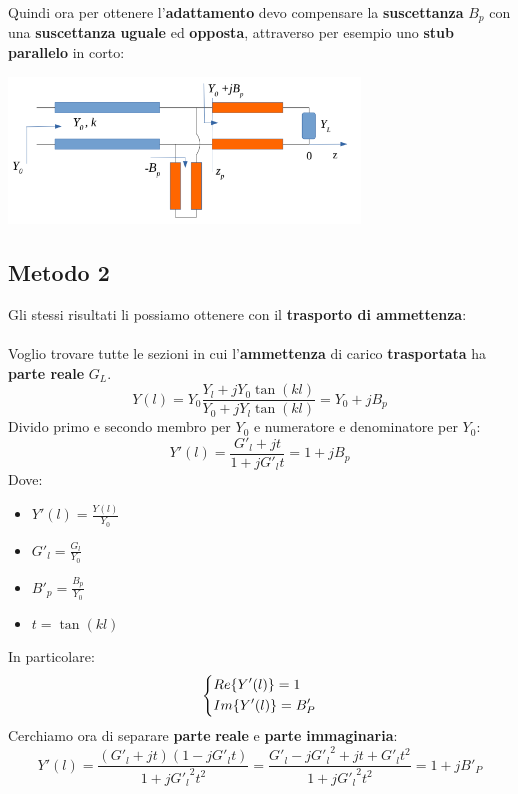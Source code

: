 Quindi ora per ottenere l'\textbf{adattamento} devo compensare la \textbf{suscettanza} $B_p$ con una \textbf{suscettanza} \textbf{uguale} ed \textbf{opposta}, attraverso per esempio uno \textbf{stub parallelo} in corto:
\begin{center}
    \includegraphics[width=0.7\textwidth]{Images/figure26.png}
\end{center}
\subsection{Metodo 2}
Gli stessi risultati li possiamo ottenere con il \textbf{trasporto di ammettenza}:\\ \\
Voglio trovare tutte le sezioni in cui l'\textbf{ammettenza} di carico \textbf{trasportata} ha \textbf{parte reale} $G_L$.
\begin{equation*}
    Y(l) = Y_0 \frac{Y_l + j Y_0 \tan(kl)}{Y_0 + j Y_l \tan(kl)} = Y_0 + j B_p
\end{equation*}
Divido primo e secondo membro per $Y_0$ e numeratore e denominatore per $Y_0$:
\begin{equation*}
    Y'(l) = \frac{G'_l + j t}{1 + j G'_l t} = 1 + j B_p
\end{equation*}
Dove:
\begin{itemize}
    \item $Y'(l) = \frac{Y(l)}{Y_0}$
    \item $G'_l = \frac{G_l}{Y_0}$
    \item $B'_p = \frac{B_p}{Y_0}$
    \item $t = \tan(kl)$
\end{itemize}
In particolare:
\begin{equation*}
    \begin{dcases}
    Re\{Y'(l)\} = 1\\
    Im\{Y'(l)\} = B'_P
    \end{dcases}
\end{equation*}
Cerchiamo ora di separare \textbf{parte} \textbf{reale} e \textbf{parte} \textbf{immaginaria}:
\begin{equation*}
    Y'(l) = \frac{(G'_l + j t)(1 - j G'_l t)}{1 + j {G'_l}^2 t^2} = \frac{G'_l - j {G'_l}^2 + jt + G'_l t^2 }{1 + j {G'_l}^2 t^2} = 1 + j B'_P
\end{equation*}
